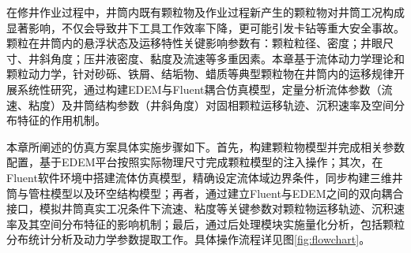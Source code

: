 在修井作业过程中，井筒内既有颗粒物及作业过程新产生的颗粒物对井筒工况构成显著影响，不仅会导致井下工具工作效率下降，更可能引发卡钻等重大安全事故。颗粒在井筒内的悬浮状态及运移特性关键影响参数有：颗粒粒径、密度；井眼尺寸、井斜角度；压井液密度、黏度及流速等多重因素。本章基于流体动力学理论和颗粒动力学，针对砂砾、铁屑、结垢物、蜡质等典型颗粒物在井筒内的运移规律开展系统性研究，通过构建EDEM与Fluent耦合仿真模型，定量分析流体参数（流速、粘度）及井筒结构参数（井斜角度）对固相颗粒运移轨迹、沉积速率及空间分布特征的作用机制。

本章所阐述的仿真方案具体实施步骤如下。首先，构建颗粒物模型并完成相关参数配置，基于EDEM平台按照实际物理尺寸完成颗粒模型的注入操作；其次，在Fluent软件环境中搭建流体仿真模型，精确设定流体域边界条件，同步构建三维井筒与管柱模型以及环空结构模型；再者，通过建立Fluent与EDEM之间的双向耦合接口，模拟井筒真实工况条件下流速、粘度等关键参数对颗粒物运移轨迹、沉积速率及其空间分布特征的影响机制；最后，通过后处理模块实施量化分析，包括颗粒分布统计分析及动力学参数提取工作。具体操作流程详见图\ref{fig:flowchart}。
